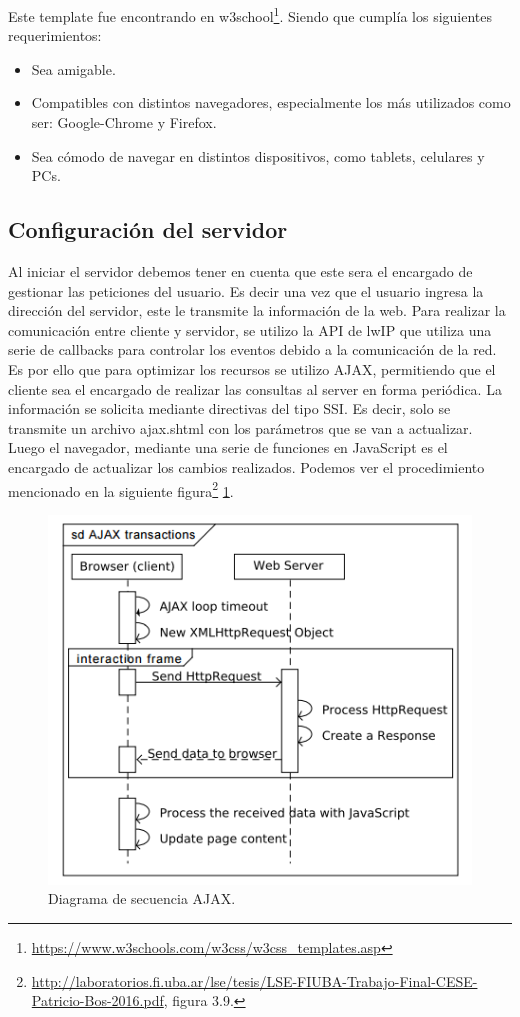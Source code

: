 Este template fue encontrando en w3school\footnote{\url{https://www.w3schools.com/w3css/w3css_templates.asp}}. Siendo que cumplía los siguientes requerimientos:
\begin{itemize}
  \item Sea amigable.
  \item Compatibles con distintos navegadores, especialmente los más utilizados como ser: Google-Chrome y Firefox. 
  \item Sea cómodo de navegar en distintos dispositivos, como tablets, celulares y PCs.
\end{itemize}


\subsection*{Configuración del servidor}
Al iniciar el servidor debemos tener en cuenta que este sera el encargado de gestionar las peticiones del usuario. Es decir una vez que el usuario ingresa la dirección del servidor, este le transmite la información de la web.  Para realizar la comunicación entre cliente y servidor, se utilizo la API de lwIP  que utiliza una serie de callbacks para controlar los eventos debido a la comunicación de la red. Es por ello que para optimizar los recursos se utilizo AJAX, permitiendo que el cliente sea el encargado de realizar las consultas al server en forma periódica. La información se solicita mediante directivas del tipo SSI.
Es decir, solo se transmite un archivo ajax.shtml con los parámetros que se van a actualizar. Luego el navegador, mediante una serie de funciones en JavaScript es el encargado de actualizar los cambios realizados.  
Podemos ver el procedimiento mencionado en la siguiente figura\footnote{\url{http://laboratorios.fi.uba.ar/lse/tesis/LSE-FIUBA-Trabajo-Final-CESE-Patricio-Bos-2016.pdf}, figura 3.9.} \ref{fig:ajax_sec}.
\begin{figure}[!htb]
    \centering
    \includegraphics[scale=.8]{./Figures/ajax_sec.png}
    \caption{Diagrama de secuencia AJAX.}
    \label{fig:ajax_sec}
\end{figure}



